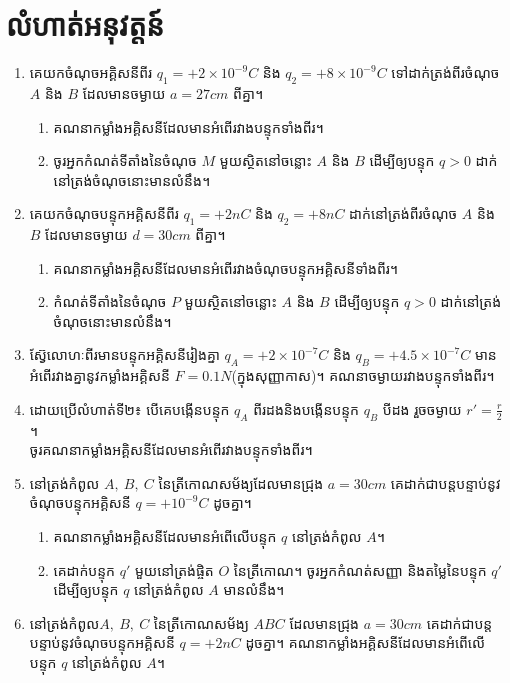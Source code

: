 \section{លំហាត់អនុវត្តន៍}
	\begin{enumerate}[m]
		\item គេយកចំណុចអគ្គិសនីពីរ $q_{1}=+2\times10^{-9}C$ និង $q_{2}=+8\times10^{-9}C$ ទៅដាក់ត្រង់ពីរចំណុច $A$ និង $B$ ដែលមានចម្ងាយ $a=27cm$ ពីគ្នា។
		\begin{enumerate}[k]
			\item គណនាកម្លាំងអគ្គិសនីដែលមានអំពើរវាងបន្ទុកទាំងពីរ។
			\item ចូរអ្នកកំណត់ទីតាំងនៃចំណុច $M$ មួយស្ថិតនៅចន្លោះ $A$ និង $B$ ដើម្បីឲ្យបន្ទុក $q>0$ ដាក់នៅត្រង់ចំណុចនោះមានលំនឹង។
		\end{enumerate}
		\item គេយកចំណុចបន្ទុកអគ្គិសនីពីរ $q_{1}=+2nC$ និង $q_{2}=+8nC$ ដាក់នៅត្រង់ពីរចំណុច $A$ និង $B$ ដែលមានចម្ងាយ $d=30cm$ ពីគ្នា។
		\begin{enumerate}[k]
			\item គណនាកម្លាំងអគ្គិសនីដែលមានអំពើរវាងចំណុចបន្ទុកអគ្គិសនីទាំងពីរ។
			\item កំណត់ទីតាំងនៃចំណុច $P$ មួយស្ថិតនៅចន្លោះ $A$ និង $B$ ដើម្បីឲ្យបន្ទុក $q>0$ ដាក់នៅត្រង់ចំណុចនោះមានលំនឹង។
		\end{enumerate} 
		\newpage
		\item ស៊្វែលោហៈពីរមានបន្ទុកអគ្គិសនីរៀងគ្នា $q_{A}=+2\times10^{-7}C$ និង $q_{B}=+4.5\times10^{-7}C$ មានអំពើរវាងគ្នានូវកម្លាំងអគ្គិសនី $F=0.1N$(ក្នុងសុញ្ញាកាស)។ គណនាចម្ងាយរវាងបន្ទុកទាំងពីរ។
		\item ដោយប្រើលំហាត់ទី២៖ បើគេបង្កើនបន្ទុក $q_{A}$ ពីរដងនិងបង្កើនបន្ទុក $q_{B}$ បីដង រួចចម្ងាយ $r'=\frac{r}{2}$។\\ ចូរគណនាកម្លាំងអគ្គិសនីដែលមានអំពើរវាងបន្ទុកទាំងពីរ។
		\item នៅត្រង់កំពូល $A,~B,~C$ នៃត្រីកោណសម័ង្យដែលមានជ្រុង $a=30cm$ គេដាក់ជាបន្តបន្ទាប់នូវចំណុចបន្ទុកអគ្គិសនី $q=+10^{-9}C$ ដូចគ្នា។
		\begin{enumerate}[k]
			\item គណនាកម្លាំងអគ្គិសនីដែលមានអំពើលើបន្ទុក $q$ នៅត្រង់កំពូល $A$។
			\item គេដាក់បន្ទុក $q'$ មួយនៅត្រង់ផ្ចិត $O$ នៃត្រីកោណ។ ចូរអ្នកកំណត់សញ្ញា និងតម្លៃនៃបន្ទុក $q'$ ដើម្បីឲ្យបន្ទុក $q$ នៅត្រង់កំពូល $A$ មានលំនឹង។
		\end{enumerate}
		\item នៅត្រង់កំពូល​ $A,~B,~C$ នៃត្រីកោណសម័ង្យ $ABC$ ដែលមានជ្រុង $a=30cm$ គេដាក់ជាបន្តបន្ទាប់នូវចំណុចបន្ទុកអគ្គិសនី $q=+2nC$ ដូចគ្នា។ គណនាកម្លាំងអគ្គិសនីដែលមានអំពើលើបន្ទុក $q$ នៅត្រង់កំពូល $A$។

\end{enumerate}
